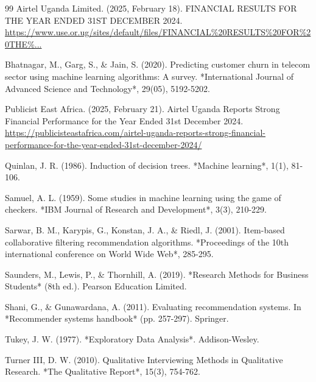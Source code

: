 \documentclass[12pt, a4paper]{report}
\begin{document}
\begin{thebibliography}{99}
 Airtel Uganda Limited. (2025, February 18). FINANCIAL RESULTS FOR THE YEAR ENDED 31ST DECEMBER 2024. \url{https://www.use.or.ug/sites/default/files/FINANCIAL%20RESULTS%20FOR%20THE%...}

 Bhatnagar, M., Garg, S., \& Jain, S. (2020). Predicting customer churn in telecom sector using machine learning algorithms: A survey. *International Journal of Advanced Science and Technology*, 29(05), 5192-5202.

 Publicist East Africa. (2025, February 21). Airtel Uganda Reports Strong Financial Performance for the Year Ended 31st December 2024. \url{https://publicisteastafrica.com/airtel-uganda-reports-strong-financial-performance-for-the-year-ended-31st-december-2024/}

 Quinlan, J. R. (1986). Induction of decision trees. *Machine learning*, 1(1), 81-106.

 Samuel, A. L. (1959). Some studies in machine learning using the game of checkers. *IBM Journal of Research and Development*, 3(3), 210-229.

 Sarwar, B. M., Karypis, G., Konstan, J. A., \& Riedl, J. (2001). Item-based collaborative filtering recommendation algorithms. *Proceedings of the 10th international conference on World Wide Web*, 285-295.

 Saunders, M., Lewis, P., \& Thornhill, A. (2019). *Research Methods for Business Students* (8th ed.). Pearson Education Limited.

 Shani, G., \& Gunawardana, A. (2011). Evaluating recommendation systems. In *Recommender systems handbook* (pp. 257-297). Springer.

 Tukey, J. W. (1977). *Exploratory Data Analysis*. Addison-Wesley.

 Turner III, D. W. (2010). Qualitative Interviewing Methods in Qualitative Research. *The Qualitative Report*, 15(3), 754-762.

\end{thebibliography}
\end{document}
